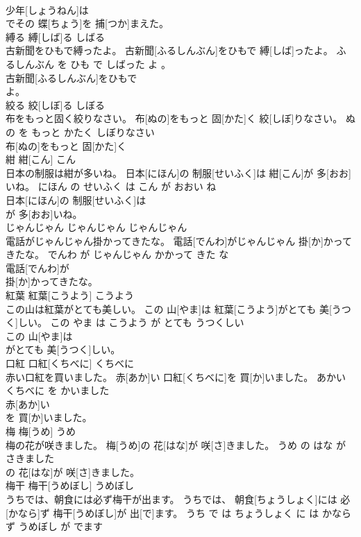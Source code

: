\documentclass[8pt]{extreport}
\begin{document}
\begin{CJK}{UTF8}{min}
\\	少年[しょうねん]は
\\	でその 蝶[ちょう]を 捕[つか]まえた。			
\\	縛る	縛[しば]る	しばる	
\\	古新聞をひもで縛ったよ。	古新聞[ふるしんぶん]をひもで 縛[しば]ったよ。	ふるしんぶん を ひも で しばった よ 。	
\\	古新聞[ふるしんぶん]をひもで
\\	よ。			
\\	絞る	絞[しぼ]る	しぼる	
\\	布をもっと固く絞りなさい。	布[ぬの]をもっと 固[かた]く 絞[しぼ]りなさい。	ぬの を もっと かたく しぼりなさい	
\\	布[ぬの]をもっと 固[かた]く
\\	紺	紺[こん]	こん	
\\	日本の制服は紺が多いね。	日本[にほん]の 制服[せいふく]は 紺[こん]が 多[おお]いね。	にほん の せいふく は こん が おおい ね	
\\	日本[にほん]の 制服[せいふく]は
\\	が 多[おお]いね。			
\\	じゃんじゃん	じゃんじゃん	じゃんじゃん	
\\	電話がじゃんじゃん掛かってきたな。	電話[でんわ]がじゃんじゃん 掛[か]かってきたな。	でんわ が じゃんじゃん かかって きた な	
\\	電話[でんわ]が
\\	掛[か]かってきたな。			
\\	紅葉	紅葉[こうよう]	こうよう	
\\	この山は紅葉がとても美しい。	この 山[やま]は 紅葉[こうよう]がとても 美[うつく]しい。	この やま は こうよう が とても うつくしい	
\\	この 山[やま]は
\\	がとても 美[うつく]しい。			
\\	口紅	口紅[くちべに]	くちべに	
\\	赤い口紅を買いました。	赤[あか]い 口紅[くちべに]を 買[か]いました。	あかい くちべに を かいました	
\\	赤[あか]い
\\	を 買[か]いました。			
\\	梅	梅[うめ]	うめ	
\\	梅の花が咲きました。	梅[うめ]の 花[はな]が 咲[さ]きました。	うめ の はな が さきました	
\\	の 花[はな]が 咲[さ]きました。			
\\	梅干	梅干[うめぼし]	うめぼし	
\\	うちでは、朝食には必ず梅干が出ます。	うちでは、 朝食[ちょうしょく]には 必[かなら]ず 梅干[うめぼし]が 出[で]ます。	うち で は ちょうしょく に は かならず うめぼし が でます	

\end{CJK}
\end{document}
